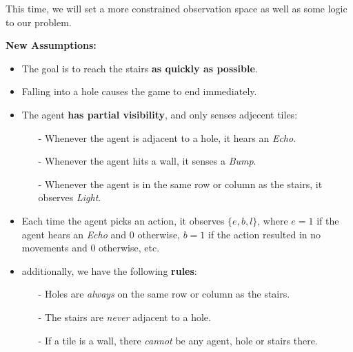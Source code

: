 \documentclass[11pt]{article}
\numberwithin{equation}{section}
\begin{document}
This time, we will set a more constrained observation space as well as some logic to our problem.

\textbf{New Assumptions:}
\begin{itemize}
    \item {\color{gray} The goal is to reach the stairs \textbf{as quickly as possible}.}
    \item {\color{gray} Falling into a hole causes the game to end immediately.}
    \item The agent \textbf{has partial visibility}, and only senses adjecent tiles:
    \begin{itemize}
        \item[-]  Whenever the agent is adjacent to a hole, it hears an \emph{Echo}.
        \item[-]  Whenever the agent hits a wall, it senses a \emph{Bump}.
        \item[-]  Whenever the agent is in the same row or column as the stairs, it observes \emph{Light}.
    \end{itemize}
    \item Each time the agent picks an action, it observes $\{e, b, l\}$, where $e=1$ if the agent hears an \emph{Echo} and 0 otherwise,  $b=1$ if the action resulted in no movements and 0 otherwise, etc.
    \item additionally, we have the following \textbf{rules}:
    \begin{itemize}
        \item[-]  Holes are \emph{always} on the same row or column as the stairs.
        \item[-]  The stairs are \emph{never} adjacent to a hole.
        \item[-]  If a tile is a wall, there \emph{cannot} be any agent, hole or stairs there.
    \end{itemize}
\end{itemize}
\end{document}
